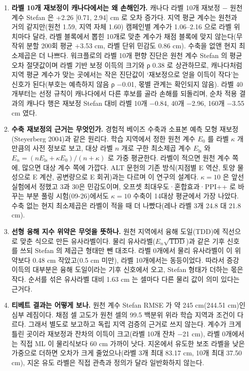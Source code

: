 \begin{enumerate}[leftmargin=1.8em, itemsep=0.45em, label=\textbf{Q\arabic*.}]
  \item \textbf{라벨 10개 재보정이 캐나다에서는 왜 손해인가.} 캐나다 라벨 10개 재보정 − 원천 계수 Stefan 은 +2.26 [0.71, 2.94] cm 로 오차 증가다. 지역 평균 계수는 원천과 거의 같지만(원천 1.59, 지역 자체 1.60) 캠페인별 계수가 1.06–2.16 으로 라벨 위치마다 달라, 라벨 블록에서 뽑힌 10개로 맞춘 계수가 채점 블록에 맞지 않는다(무작위 분할 200회 평균 +3.53 cm, 라벨 단위 민감도 0.86 cm). 수축을 없앤 현지 최소제곱은 더 나쁘다. 워크플로의 라벨 10개 편향 진단은 원천 계수 Stefan 의 평균 오차 절댓값이며 라벨 기반 보정 이득의 크기와 ρ 0.38 로 상관하므로, 캐나다처럼 지역 평균 계수가 맞는 곳에서는 작은 진단값이 ‘재보정으로 얻을 이득이 작다’는 신호가 된다(부호는 예측하지 않음 ρ −0.01, 몫별 관계는 확인되지 않음). 라벨 40개부터는 선정 규칙이 캐나다에서 다른 후보를 골라 손해를 되돌리며, 순차 적용 결과의 캐나다 행은 재보정 Stefan 대비 라벨 10개 −0.84, 40개 −2.96, 160개 −3.55 cm 였다.
  \item \textbf{수축 재보정의 근거는 무엇인가.} 경험적 베이즈 수축과 소표본 예측 모형 재보정(Steyerberg 2004)과 같은 원리다. 학습 지역에서 정한 원천 계수 $E_0$ 를 라벨 $\kappa$ 개만큼의 사전 정보로 보고, 대상 라벨 $n$ 개로 구한 최소제곱 계수 $E_{\mathrm{ls}}$ 와 $E_n=(nE_{\mathrm{ls}}+\kappa E_0)/(n+\kappa)$ 로 가중 평균한다. 라벨이 적으면 원천 계수 쪽에, 많으면 대상 계수 쪽에 가깝다. ALT 문헌의 기존 방식(지점별 E 역산, 토양 물성으로 E 계산, 공변량으로 E 회귀)과는 다르며 이 연구의 설계다. $\kappa=10$ 은 앞선 실험에서 정했고 3과 30은 민감도이며, 오프셋 최대우도·혼합효과·PPI++ 로 바꾸는 부분 풀링 시험(09-26)에서도 $\kappa=10$ 수축이 14대상 평균에서 가장 나았다. 수축 없는 현지 최소제곱은 라벨이 적을 때 더 나빴다(레나 라벨 3개 24.8 대 21.8 cm).
  \item \textbf{선형 융해 지수 위약은 무엇을 뜻하나.} 원천 지역에서 융해 도일(TDD)에 직선으로 맞춘 식으로 만든 유사라벨이다. 물리 유사라벨($E_n\sqrt{\mathrm{TDD}}$)과 같은 기후 신호를 쓰되 Stefan 의 제곱근 형태만 뺀 대조다. 라벨 0개에서 물리 유사라벨이 이 위약보다 0.48 cm 작았고(0.5 cm 미만), 라벨 10개에서는 동등이었다. 따라서 증강 이득의 대부분은 융해 도일이라는 기후 신호에서 오고, Stefan 형태가 더하는 몫은 작다. 순서를 섞은 유사라벨 대비 1.63 cm 는 셀마다 다른 물리 값이 의미 있다는 근거다.
  \item \textbf{티베트 결과는 어떻게 보나.} 원천 계수 Stefan RMSE 가 약 245 cm(244.51 cm)인 심부 레짐이다. 채점 셀 고도가 원천 셀의 99.5 백분위 위라 학습 지역과 조건이 다르다. 그래서 별도로 보고하고 독립 지역 검증의 근거로 쓰지 않는다. 계수가 크게 틀린 곳이라 재보정과 잔차의 이득이 크고(라벨 10개 잔차 −21 cm), 라벨 0개에서는 직접 ML 이 물리식보다 60 cm 가까이 낫다. 지온에서 유도한 보조 라벨을 낮은 가중으로 더하면 오차가 크게 줄었으나(라벨 3개 최대 83.17 cm, 10개 최대 37.50 cm), 지온 유도 라벨은 직접 관측과 정의가 달라 일반화하지 않는다.

\end{enumerate}
